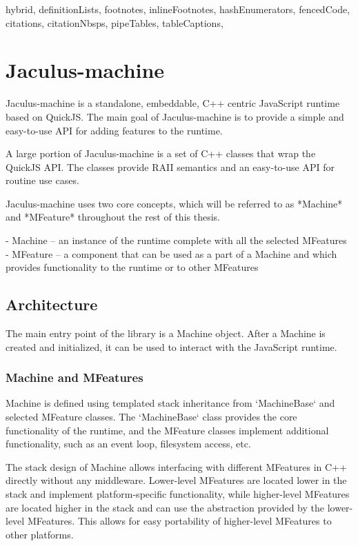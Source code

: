 \begin{markdown*}{%
  hybrid,
  definitionLists,
  footnotes,
  inlineFootnotes,
  hashEnumerators,
  fencedCode,
  citations,
  citationNbsps,
  pipeTables,
  tableCaptions,
}

\chapter{Jaculus-machine}

Jaculus-machine is a standalone, embeddable, C++ centric JavaScript runtime based on QuickJS. The main goal of Jaculus-machine is to provide a simple and easy-to-use API for adding features to the runtime.

A large portion of Jaculus-machine is a set of C++ classes that wrap the QuickJS API. The classes provide RAII semantics and an easy-to-use API for routine use cases.

Jaculus-machine uses two core concepts, which will be referred to as *Machine* and *MFeature* throughout the rest of this thesis.

  - Machine -- an instance of the runtime complete with all the selected MFeatures
  - MFeature -- a component that can be used as a part of a Machine and which provides functionality to the runtime or to other MFeatures

\section{Architecture}

The main entry point of the library is a Machine object. After a Machine is created and initialized, it can be used to interact with the JavaScript runtime.

\subsection{Machine and MFeatures}

Machine is defined using templated stack inheritance from `MachineBase` and selected MFeature classes. The `MachineBase` class provides the core functionality of the runtime, and the MFeature classes implement additional functionality, such as an event loop, filesystem access, etc.

The stack design of Machine allows interfacing with different MFeatures in C++ directly without any middleware. Lower-level MFeatures are located lower in the stack and implement platform-specific functionality, while higher-level MFeatures are located higher in the stack and can use the abstraction provided by the lower-level MFeatures. This allows for easy portability of higher-level MFeatures to other platforms.


\end{markdown*}
